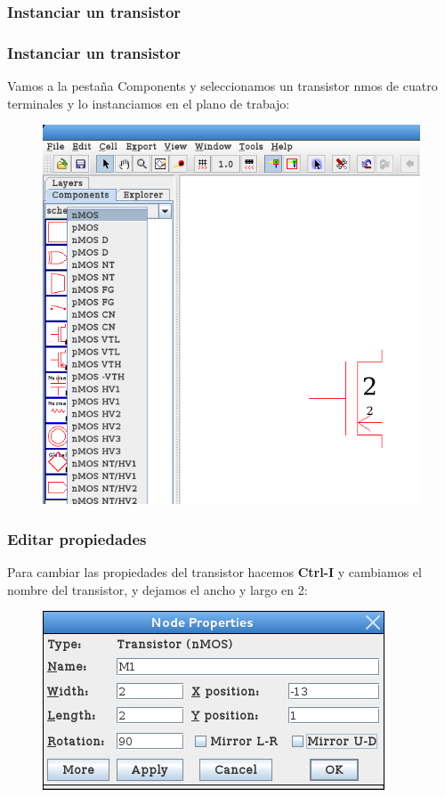 \documentclass{beamer}
\begin{document}
\begin{frame}
\subsubsection{Instanciar un transistor}
\frametitle{Instanciar un transistor}
Vamos a la pestaña Components y seleccionamos un transistor nmos de cuatro terminales y lo instanciamos en el plano de trabajo:
\begin{figure}
\includegraphics[width=0.5\linewidth]{figuras/edicionElectric-2b.png}
\end{figure}
\end{frame}
\begin{frame}
\frametitle{Editar propiedades}
Para cambiar las propiedades del transistor hacemos \textbf{Ctrl-I} y cambiamos el nombre del transistor, y dejamos el ancho y largo en 2:
\begin{figure}
\includegraphics[width=0.5\linewidth]{figuras/edicionElectric-3.png}
\end{figure}
\end{frame}
\end{document}
